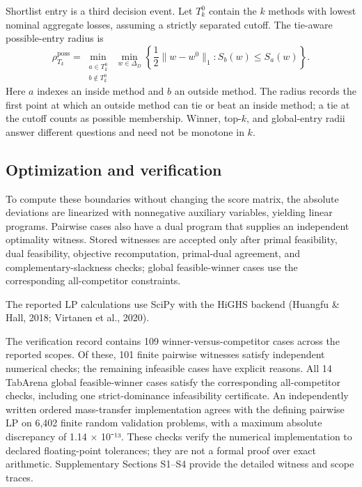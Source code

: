 \documentclass[11pt]{article}
\begin{document}
Shortlist entry is a third decision event. Let $T_k^0$ contain the $k$ methods with lowest nominal aggregate losses, assuming a strictly separated cutoff. The tie-aware possible-entry radius is
\begin{equation}
\rho_{T_k}^{\mathrm{poss}}=
\min_{\substack{a\in T_k^0\\ b\notin T_k^0}}\ 
\min_{w\in\Delta_D}\left\{\frac12\lVert w-w^0\rVert_1:S_b(w)\le S_a(w)\right\}.
\label{eq:topk}
\end{equation}
Here $a$ indexes an inside method and $b$ an outside method. The radius records the first point at which an outside method can tie or beat an inside method; a tie at the cutoff counts as possible membership. Winner, top-$k$, and global-entry radii answer different questions and need not be monotone in $k$.

\subsection{Optimization and verification}

To compute these boundaries without changing the score matrix, the absolute deviations are linearized with nonnegative auxiliary variables, yielding linear programs. Pairwise cases also have a dual program that supplies an independent optimality witness. Stored witnesses are accepted only after primal feasibility, dual feasibility, objective recomputation, primal-dual agreement, and complementary-slackness checks; global feasible-winner cases use the corresponding all-competitor constraints.

The reported LP calculations use SciPy with the HiGHS backend (Huangfu \& Hall, 2018; Virtanen et al., 2020).

The verification record contains 109 winner-versus-competitor cases across the reported scopes. Of these, 101 finite pairwise witnesses satisfy independent numerical checks; the remaining infeasible cases have explicit reasons. All 14 TabArena global feasible-winner cases satisfy the corresponding all-competitor checks, including one strict-dominance infeasibility certificate. An independently written ordered mass-transfer implementation agrees with the defining pairwise LP on 6,402 finite random validation problems, with a maximum absolute discrepancy of 1.14 × 10⁻¹³. These checks verify the numerical implementation to declared floating-point tolerances; they are not a formal proof over exact arithmetic. Supplementary Sections S1–S4 provide the detailed witness and scope traces.
\end{document}
